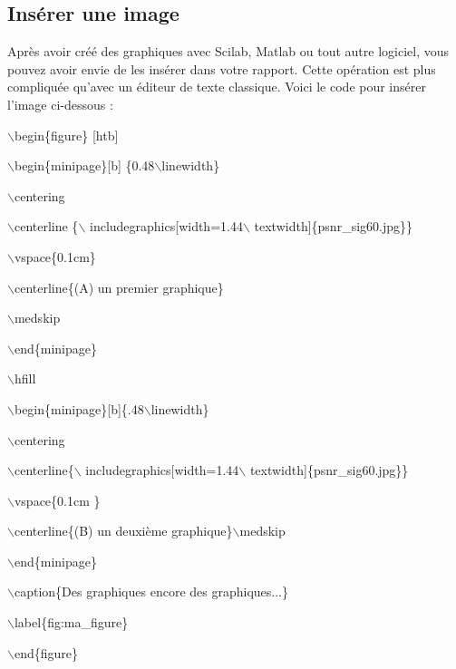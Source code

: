 \documentclass[11pt]{article}
\theoremstyle{remark}
\theoremstyle{definition}
\begin{document}

\subsection{Insérer une image }

Après avoir créé des graphiques avec Scilab, Matlab ou tout autre logiciel,  vous pouvez avoir envie de les insérer dans votre rapport. Cette opération est plus compliquée qu'avec un éditeur de texte classique. Voici le code pour insérer l'image ci-dessous : \medskip

$\backslash$begin\{figure\} [htb]

$\backslash$begin\{minipage\}[b] \{0.48$\backslash$linewidth\}

$\backslash$centering

$\backslash$centerline \{$\backslash$ includegraphics[width=1.44$\backslash$ textwidth]\{psnr\_sig60.jpg\}\}

$\backslash$vspace\{0.1cm\}

$\backslash$centerline\{(A) un premier graphique\}

$\backslash$medskip

$\backslash$end\{minipage\}

$\backslash$hfill

$\backslash$begin\{minipage\}[b]\{.48$\backslash$linewidth\}

$\backslash$centering

$\backslash$centerline\{$\backslash$ includegraphics[width=1.44$\backslash$ textwidth]\{psnr\_sig60.jpg\}\}

$\backslash$vspace\{0.1cm \}

$\backslash$centerline\{(B) un deuxième graphique\}$\backslash$medskip

$\backslash$end\{minipage\}

$\backslash$caption\{Des graphiques encore des graphiques...\}

$\backslash$label\{fig:ma\_figure\}

$\backslash$end\{figure\} \medskip
\end{document}
